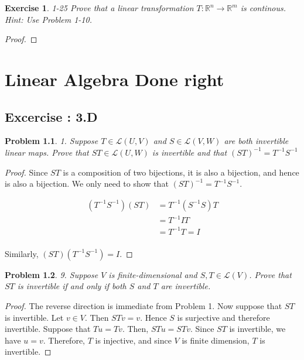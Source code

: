 \documentclass[12pt]{book}
\newtheorem*{problem*}{Problem}
\newtheorem*{exercise*}{Exercise}
\newcommand{\LL}{\mathcal{L}}
\begin{document}
\begin{exercise*}
  1-25 Prove that a linear transformation $T : \mathbb{R}^n \to \mathbb{R}^m$ is continous. Hint: Use Problem 1-10.
\end{exercise*}

\begin{proof}
  
\end{proof}

%

\chapter{Linear Algebra Done right}

\section{Excercise : 3.D}

\begin{problem*}
  1. Suppose $T \in \LL(U,V)$ and $ S \in \LL(V,W)$ are both invertible
  linear maps. Prove that $ST \in \LL(U,W)$ is invertible and that $(ST)^{-1} = T^{-1}S^{-1}$
\end{problem*}

\begin{proof}
  Since $ST$ is a composition of two bijections, it is also a bijection, and hence is also a bijection. We only need to show that $(ST)^{-1} = T^{-1}S^{-1}$.

  \begin{align*}
    (T^{-1} S^{-1}) (S T) & = T^{-1} (S^{-1} S) T\\
    & = T^{-1} I T\\
    & = T^{-1}T = I \\
  \end{align*}

  Similarly, $(S T) (T^{-1} S^{-1}) = I$.
\end{proof}

\begin{problem*}9. Suppose $V$ is finite-dimensional and $S,T \in \LL(V)$. Prove that $ST$ is invertible if and only if both $S$ and $T$ are invertible.\end{problem*}

\begin{proof}
  The reverse direction is immediate from Problem 1. Now suppose that $ST$ is invertible. Let $v \in V$. Then $STv = v$. Hence $S$ is surjective and therefore invertible. Suppose that $Tu = Tv$. Then, $ST u = ST v$. Since $ST$ is invertible, we have $u = v$. Therefore, $T$ is injective, and since $V$ is finite dimension, $T$ is invertible. 
\end{proof}
\end{document}
